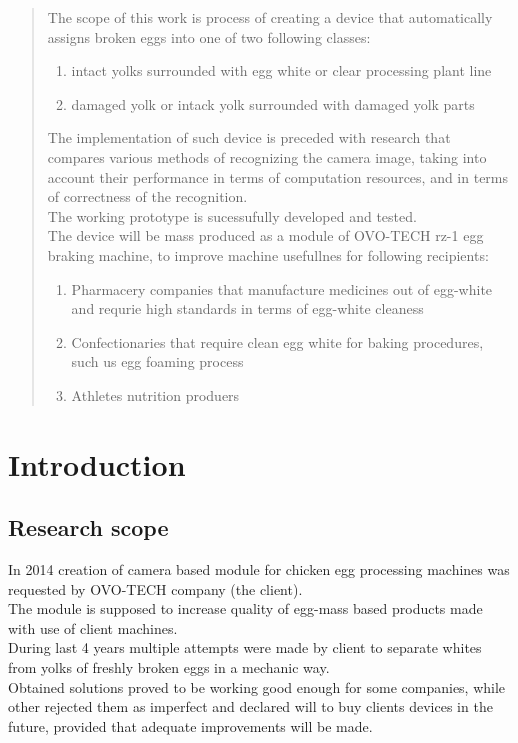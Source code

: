 \documentclass[12pt,twoside,a4paper]{article}
\begin{document}
\begin{abstract}
The scope of this work is process of creating a device that automatically assigns broken eggs into one of two following classes:
\begin{enumerate}
\item intact yolks surrounded with egg white or clear processing plant line
\item damaged yolk or intack yolk surrounded with damaged yolk parts
\end{enumerate}
The implementation of such device is preceded with research that compares various methods of recognizing the camera image, taking into account their performance in terms of computation resources, and in terms of correctness of the recognition.\\
The working prototype is sucessufully developed and tested.\\
The device will be mass produced as a module of OVO-TECH rz-1 egg braking machine, to improve machine usefullnes for following recipients:
\begin{enumerate}
\item Pharmacery companies that manufacture medicines out of egg-white and requrie high standards in terms of egg-white cleaness
\item Confectionaries that require clean egg white for baking procedures, such us egg foaming process
\item Athletes nutrition produers
\end{enumerate}


\end{abstract}

\tableofcontents



\section{Introduction}
\subsection{Research scope}
In 2014 creation of  camera based  module for chicken egg processing machines was requested by OVO-TECH company (the client).\\
The module is supposed to increase quality of egg-mass based  products made with use of  client machines.\\

During last 4 years multiple attempts were made by client to separate whites from yolks of freshly broken eggs in a mechanic way.\\ 
Obtained solutions proved to be working good enough for some companies, while other rejected them as imperfect and declared will to buy clients devices in the future, provided that adequate improvements will be made.
\end{document}
